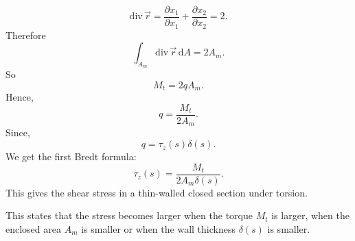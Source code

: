 \begin{equation*}
  \mathrm{div} \, \Vec{r} = \frac{\partial x_1}{\partial x_1}  + \frac{\partial x_2}{\partial x_2}  = 2
.\end{equation*}
Therefore
\begin{equation*}
  \int_{A_m} \mathrm{div} \, \Vec{r} \, \mathrm{d}A = 2 A_m
.\end{equation*}
So
\begin{equation*}
  M_t = 2q A_m
.\end{equation*}
Hence,
\begin{equation*}
  q = \frac{M_t}{2A_m}
.\end{equation*}
Since,
\begin{equation*}
  q = \tau_z(s) \delta(s)
.\end{equation*}
We get the first Bredt formula:
\begin{equation*}
  \tau_z(s) = \frac{M_t}{2 A_m \delta(s)}
.\end{equation*}
This gives the shear stress in a thin-walled closed section under torsion.

This states that the stress becomes larger when the torque $M_t$ is larger, when the enclosed area $A_m$ is smaller or when the wall thickness $\delta(s)$ is smaller.

